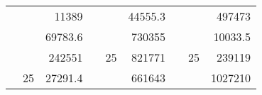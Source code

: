 \begin{table}[H]
\begin{tabular}{|ccrccrccc}
\rowcolor[HTML]{DAE8FC} 
\multicolumn{1}{|c|}{\cellcolor[HTML]{FFFFC7}}                                & \multicolumn{1}{c|}{\cellcolor[HTML]{DAE8FC}}                      & \multicolumn{1}{r|}{\cellcolor[HTML]{DAE8FC}11389}     & \multicolumn{1}{c|}{\cellcolor[HTML]{FFFFC7}}                                & \multicolumn{1}{c|}{\cellcolor[HTML]{DAE8FC}}                       & \multicolumn{1}{r|}{\cellcolor[HTML]{DAE8FC}44555.3}   & \multicolumn{1}{c|}{\cellcolor[HTML]{FFFFC7}}                                & \multicolumn{1}{c|}{\cellcolor[HTML]{DAE8FC}}                      & \multicolumn{1}{r|}{\cellcolor[HTML]{DAE8FC}497473}    \\ \cline{3-3} \cline{6-6} \cline{9-9} 
\multicolumn{1}{|c|}{\cellcolor[HTML]{FFFFC7}}                                & \multicolumn{1}{c|}{\cellcolor[HTML]{DAE8FC}}                      & \multicolumn{1}{r|}{\cellcolor[HTML]{DDFDFF}69783.6}   & \multicolumn{1}{c|}{\cellcolor[HTML]{FFFFC7}}                                & \multicolumn{1}{c|}{\cellcolor[HTML]{DAE8FC}}                       & \multicolumn{1}{r|}{\cellcolor[HTML]{DDFDFF}730355}    & \multicolumn{1}{c|}{\cellcolor[HTML]{FFFFC7}}                                & \multicolumn{1}{c|}{\cellcolor[HTML]{DAE8FC}}                      & \multicolumn{1}{r|}{\cellcolor[HTML]{DDFDFF}10033.5}   \\ \cline{3-3} \cline{6-6} \cline{9-9} 
\rowcolor[HTML]{DAE8FC} 
\multicolumn{1}{|c|}{\cellcolor[HTML]{FFFFC7}}                                & \multicolumn{1}{c|}{\cellcolor[HTML]{DAE8FC}}                      & \multicolumn{1}{r|}{\cellcolor[HTML]{DAE8FC}242551}    & \multicolumn{1}{c|}{\cellcolor[HTML]{FFFFC7}}                                & \multicolumn{1}{c|}{\multirow{-9}{*}{\cellcolor[HTML]{DAE8FC}25}}   & \multicolumn{1}{r|}{\cellcolor[HTML]{DAE8FC}821771}    & \multicolumn{1}{c|}{\cellcolor[HTML]{FFFFC7}}                                & \multicolumn{1}{c|}{\multirow{-9}{*}{\cellcolor[HTML]{DAE8FC}25}}  & \multicolumn{1}{r|}{\cellcolor[HTML]{DAE8FC}239119}    \\ \cline{3-3} \cline{5-6} \cline{8-9} 
\multicolumn{1}{|c|}{\cellcolor[HTML]{FFFFC7}}                                & \multicolumn{1}{c|}{\multirow{-10}{*}{\cellcolor[HTML]{DAE8FC}25}} & \multicolumn{1}{r|}{\cellcolor[HTML]{DDFDFF}27291.4}   & \multicolumn{1}{c|}{\cellcolor[HTML]{FFFFC7}}                                & \multicolumn{1}{c|}{\cellcolor[HTML]{DDFDFF}}                       & \multicolumn{1}{r|}{\cellcolor[HTML]{DAE8FC}661643}    & \multicolumn{1}{c|}{\cellcolor[HTML]{FFFFC7}}                                & \multicolumn{1}{c|}{\cellcolor[HTML]{DDFDFF}}                      & \multicolumn{1}{r|}{\cellcolor[HTML]{DAE8FC}1027210}   \\ \cline{2-3} \cline{6-6} \cline{9-9} 

\end{tabular}
\end{table}
